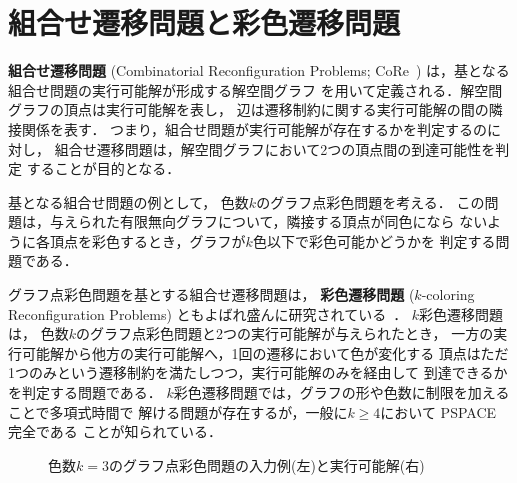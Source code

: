 ﻿\section{組合せ遷移問題と彩色遷移問題}\label{chap:background}


\textbf{組合せ遷移問題}
(Combinatorial Reconfiguration Problems;
CoRe~\cite{core:ItoDHPSUU11,core:Nishimura18,core:Heuvel13})
は，基となる組合せ問題の実行可能解が形成する解空間グラフ
を用いて定義される．解空間グラフの頂点は実行可能解を表し，
辺は遷移制約に関する実行可能解の間の隣接関係を表す．
つまり，組合せ問題が実行可能解が存在するかを判定するのに対し，
組合せ遷移問題は，解空間グラフにおいて2つの頂点間の到達可能性を判定
することが目的となる．


基となる組合せ問題の例として，
色数$k$のグラフ点彩色問題を考える．
この問題は，与えられた有限無向グラフについて，隣接する頂点が同色になら
ないように各頂点を彩色するとき，グラフが$k$色以下で彩色可能かどうかを
判定する問題である．

グラフ点彩色問題を基とする組合せ遷移問題は，
\textbf{彩色遷移問題}
($k$-coloring Reconfiguration Problems)
ともよばれ盛んに研究されている~\cite{core:gcp:BonsmaC09,core:gcp:CerecedaHJ11}．
$k$彩色遷移問題は，
色数$k$のグラフ点彩色問題と2つの実行可能解が与えられたとき，
一方の実行可能解から他方の実行可能解へ，1回の遷移において色が変化する
頂点はただ1つのみという遷移制約を満たしつつ，実行可能解のみを経由して
到達できるかを判定する問題である．
$k$彩色遷移問題では，グラフの形や色数に制限を加えることで多項式時間で
解ける問題が存在するが，一般に$k \ge 4$において PSPACE 完全である
ことが知られている．

\begin{figure}[t]
  \centering
  \scalebox{0.7}{}
  \quad
  \scalebox{0.7}{}
  \caption{色数$k=3$のグラフ点彩色問題の入力例(左)と実行可能解(右)}
  \label{fig:graph}
\end{figure}

